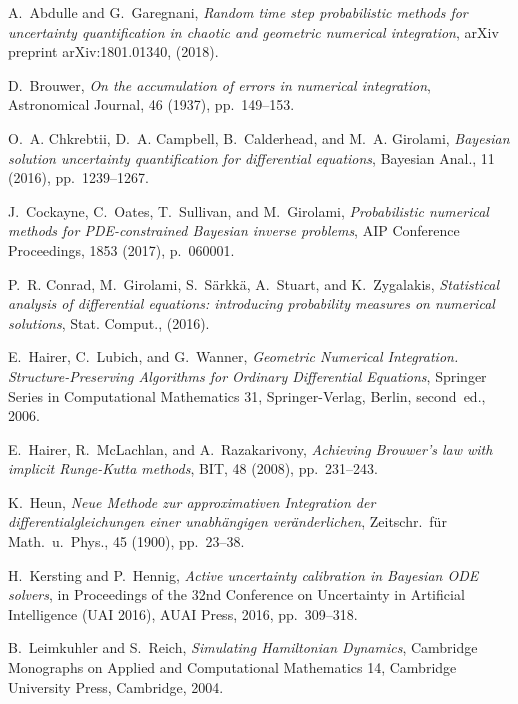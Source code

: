 \documentclass[10pt]{article}
\begin{document}
\def\cprime{$'$}
\begin{thebibliography}{10}
	
	{\sc A.~Abdulle and G.~Garegnani}, {\em Random time step probabilistic methods
		for uncertainty quantification in chaotic and geometric numerical
		integration}, arXiv preprint arXiv:1801.01340,  (2018).
	
	{\sc D.~Brouwer}, {\em On the accumulation of errors in numerical integration},
	Astronomical Journal, 46 (1937), pp.~149--153.
	
	{\sc O.~A. Chkrebtii, D.~A. Campbell, B.~Calderhead, and M.~A. Girolami}, {\em
		Bayesian solution uncertainty quantification for differential equations},
	Bayesian Anal., 11 (2016), pp.~1239--1267.
	
	{\sc J.~Cockayne, C.~Oates, T.~Sullivan, and M.~Girolami}, {\em Probabilistic
		numerical methods for {PDE}-constrained {B}ayesian inverse problems}, AIP
	Conference Proceedings, 1853 (2017), p.~060001.
	
	{\sc P.~R. Conrad, M.~Girolami, S.~S{\"a}rkk{\"a}, A.~Stuart, and
		K.~Zygalakis}, {\em Statistical analysis of differential equations:
		introducing probability measures on numerical solutions}, Stat. Comput.,
	(2016).
	
	{\sc E.~Hairer, C.~Lubich, and G.~Wanner}, {\em Geometric Numerical
		Integration. Structure-Preserving Algorithms for Ordinary Differential
		Equations}, Springer Series in Computational Mathematics 31, Springer-Verlag,
	Berlin, second~ed., 2006.
	
	{\sc E.~Hairer, R.~McLachlan, and A.~Razakarivony}, {\em Achieving {B}rouwer's
		law with implicit {R}unge-{K}utta methods}, BIT, 48 (2008), pp.~231--243.
	
	{\sc K.~Heun}, {\em Neue {M}ethode zur approximativen {I}ntegration der
		dif\-feren\-tial\-gleichungen einer unabh\"angigen ver\"anderlichen},
	Zeitschr.\ f\"ur Math.\ u.\ Phys., 45 (1900), pp.~23--38.
	
	{\sc H.~Kersting and P.~Hennig}, {\em Active uncertainty calibration in
		{B}ayesian {ODE} solvers}, in Proceedings of the 32nd Conference on
	Uncertainty in Artificial Intelligence (UAI 2016), {AUAI} Press, 2016,
	pp.~309--318.
	
	{\sc B.~Leimkuhler and S.~Reich}, {\em Simulating {H}amiltonian {D}ynamics},
	Cambridge Monographs on Applied and Computational Mathematics 14, Cambridge
	University Press, Cambridge, 2004.
	

\end{thebibliography}
\end{document}
